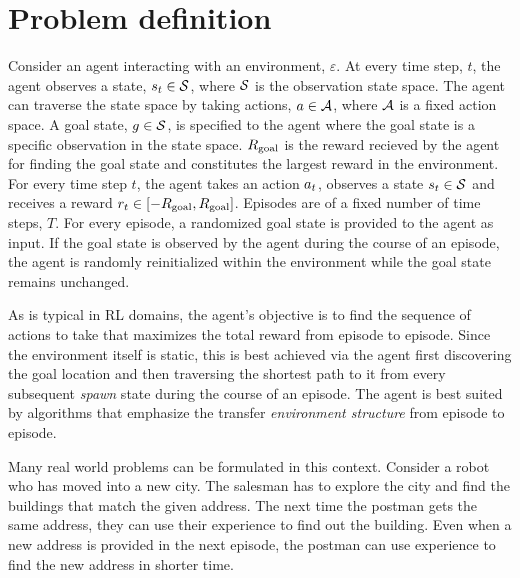 \section{Problem definition}

Consider an agent interacting with an environment, $\varepsilon$. At
every time step, $t$, the agent observes a state, $s_t \in \mathcal{S}$,
where $\mathcal{S}$ is the observation state space. The agent can traverse
the state space by taking actions, $a \in \mathcal{A}$, where $\mathcal{A}$ is a
fixed action space. A goal state, $g \in \mathcal{S}$, is specified to
the agent where the goal state is a specific observation in the state
space.  $R_{\text{goal}}$ is the reward recieved by the agent for finding the
goal state and constitutes the largest reward in the environment.  For
every time step $t$, the agent takes an action $a_t$, observes a
state $s_t \in \mathcal{S}$ and receives a reward $r_t \in [-R_{\text{goal}},
R_{\text{goal}}]$.  Episodes are of a fixed number of time steps, $T$. For every
episode, a randomized goal state is provided to the agent as input. If
the goal state is observed by the agent during the course of an episode,
the agent is randomly reinitialized within the environment while the
goal state remains unchanged.

As is typical in RL domains, the agent's objective is to find the
sequence of actions to take that maximizes the total reward from episode
to episode. Since the environment itself is static, this is best
achieved via the agent first discovering the goal location and then
traversing the shortest path to it from every subsequent \emph{spawn}
state during the course of an episode. The agent is best suited by
algorithms that emphasize the  transfer \emph{environment structure}
from episode to episode. 



%
%

Many real world problems can be formulated in this context. Consider a robot
who has moved into a new city.
The salesman has to explore the city and find the buildings that match the given
address. The next time the postman gets the same address, they can use their
experience to find out the building. Even when a new address is provided in the
next episode, the postman can use experience to find the new address in shorter
time.

